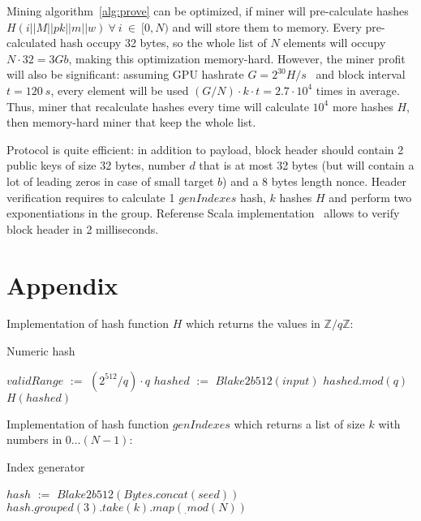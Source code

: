 \documentclass[]{article}
\def\Let#1#2{\State #1 $:=$ #2}
\begin{document}
    Mining algorithm~\ref{alg:prove} can be optimized, if miner will pre-calculate
    hashes $H(i||M||pk||m||w)~\forall~i~\in~[0,N)$ and will store them to memory.
    Every pre-calculated hash occupy 32 bytes, so the whole list of $N$ elements
    will occupy $N \cdot 32 = 3 Gb$, making this optimization memory-hard.
    However, the miner profit will also be significant: assuming GPU hashrate
    $G = 2^{30} H/s$~\cite{gpuHashrate} and block interval $t=120~s$, every element
    will be used $(G / N) \cdot k \cdot t = 2.7 \cdot 10^4$ times in average. Thus, miner that
    recalculate hashes every time will calculate $10^4$ more hashes $H$, then
    memory-hard miner that keep the whole list.

    Protocol is quite efficient: in addition to payload, block header should
    contain 2 public keys of size 32 bytes, number $d$ that is at most 32 bytes
    (but will contain a lot of leading zeros in case of small target $b$) and a
    8 bytes length nonce. Header verification requires to calculate 1 $genIndexes$
    hash, $k$ hashes $H$ and perform two exponentiations in the group. Referense
    Scala implementation~\cite{ergoGit} allows to verify block header in 2 milliseconds.

    

    \section*{Appendix}
    \label{appendix}

    Implementation of hash function $H$ which returns the values in $\mathbb{Z}/q\mathbb{Z}$:

    \begin{algorithm}[H]
        \caption{Numeric hash}
        \label{alg:H}
        \begin{algorithmic}[1]
            \Let{$validRange$}{$(2^{512} / q) \cdot q$}
            \Let{$hashed$}{$Blake2b512(input)$}
            \State \Return $hashed.mod(q)$
            \Else
            \State \Return $H(hashed)$
            \EndIf
            \EndFunction
        \end{algorithmic}
    \end{algorithm}

    Implementation of hash function $genIndexes$ which returns a list of size $k$ with numbers in $0\dots (N-1)$:

    \begin{algorithm}[H]
        \caption{Index generator}
        \label{alg:genIndexes}
        \begin{algorithmic}[1]
            \Let{$hash$}{$Blake2b512(Bytes.concat(seed))$}
            \State \Return $hash.grouped(3).take(k).map(_.mod(N))$
            \EndFunction
        \end{algorithmic}
    \end{algorithm}
\end{document}
